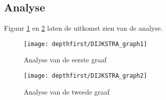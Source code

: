 \subsection{Analyse}

Figuur \ref{fig:DIJKSTRA_graph1} en \ref{fig:DIJKSTRA_graph2} laten de uitkomst zien van de analyse.

\begin{figure}[h]
	\texttt{[image: depthfirst/DIJKSTRA\_graph1]}
	\centering
	\caption{Analyse van de eerste graaf}
	\label{fig:DIJKSTRA_graph1}
\end{figure}

\begin{figure}[h]
	\texttt{[image: depthfirst/DIJKSTRA\_graph2]}
	\centering
	\caption{Analyse van de tweede graaf}
	\label{fig:DIJKSTRA_graph2}
\end{figure}